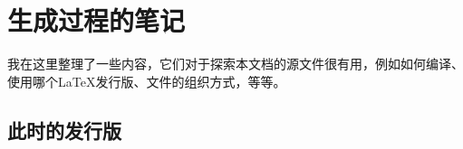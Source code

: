\chapter{生成过程的笔记}

我在这里整理了一些内容，它们对于探索本文档的源文件很有用，例如如何编译、使用哪个\LaTeX 发行版、文件的组织方式，等等。

\section{此时的发行版}

